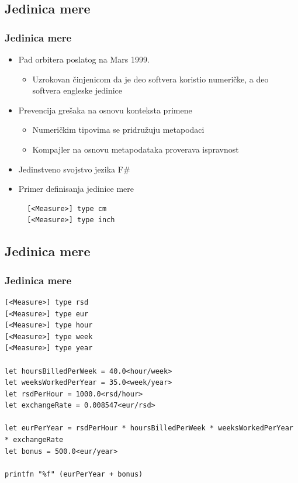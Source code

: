 \documentclass{beamer}
\begin{document}
\subsection*{Jedinica mere}
\begin{frame}[fragile]
\frametitle{Jedinica mere}

\begin{itemize}
  \item Pad orbitera poslatog na Mars 1999.
  \begin{itemize}
  	\item Uzrokovan činjenicom da je deo softvera koristio numeričke, a deo softvera engleske jedinice
  \end{itemize}
  \item Prevencija grešaka na osnovu konteksta primene
  \begin{itemize}
  	\item Numeričkim tipovima se pridružuju metapodaci
  	\item Kompajler na osnovu metapodataka proverava ispravnost
  \end{itemize}
  \item Jedinstveno svojstvo jezika F\#
  \item Primer definisanja jedinice mere  
\begin{lstlisting}
  [<Measure>] type cm
  [<Measure>] type inch  
\end{lstlisting}
\end{itemize}
\end{frame}

\subsection*{Jedinica mere}
\begin{frame}[fragile]
\frametitle{Jedinica mere}

\begin{lstlisting}
[<Measure>] type rsd
[<Measure>] type eur
[<Measure>] type hour
[<Measure>] type week
[<Measure>] type year

let hoursBilledPerWeek = 40.0<hour/week>
let weeksWorkedPerYear = 35.0<week/year>
let rsdPerHour = 1000.0<rsd/hour>
let exchangeRate = 0.008547<eur/rsd>

let eurPerYear = rsdPerHour * hoursBilledPerWeek * weeksWorkedPerYear * exchangeRate
let bonus = 500.0<eur/year>

printfn "%f" (eurPerYear + bonus)
\end{lstlisting}
\end{frame}
\end{document}
